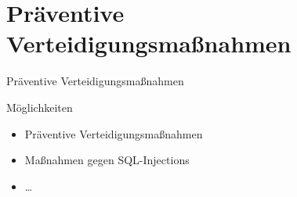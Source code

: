 \section{Präventive Verteidigungsmaßnahmen}
\begin{frame}{Präventive Verteidigungsmaßnahmen}
\begin{exampleblock}{Möglichkeiten}
\begin{itemize}
\item Präventive Verteidigungsmaßnahmen
\pause
\item Maßnahmen gegen SQL-Injections
\item \dots
\end{itemize}
\end{exampleblock}
\end{frame}
